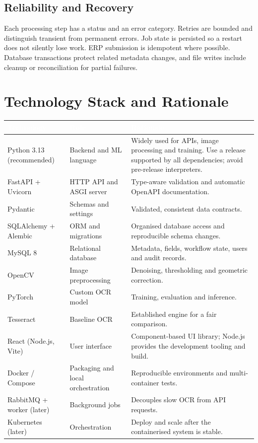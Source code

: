 \documentclass[11pt,a4paper]{report}
\newcommand{\hdr}[1]{\textcolor{white}{\sffamily\bfseries #1}}
\newcommand{\tblstart}{\rowcolors{2}{white}{rowgray}\arrayrulecolor{teal!60}}
\newcommand{\hdrrow}{\rowcolor{navy}}
\begin{document}
\section{Reliability and Recovery}
Each processing step has a status and an error category. Retries are bounded and distinguish transient from permanent errors. Job state is persisted so a restart does not silently lose work. ERP submission is idempotent where possible. Database transactions protect related metadata changes, and file writes include cleanup or reconciliation for partial failures.

\chapter{Technology Stack and Rationale}
{\tblstart\small
\begin{longtable}{L{3.3cm}L{3.5cm}L{6.9cm}}
\hdrrow \hdr{Technology} & \hdr{Role} & \hdr{Rationale}\\ \endhead
Python 3.13 (recommended) & Backend and ML language & Widely used for APIs, image processing and training. Use a release supported by all dependencies; avoid pre-release interpreters.\\
FastAPI + Uvicorn & HTTP API and ASGI server & Type-aware validation and automatic OpenAPI documentation.\\
Pydantic & Schemas and settings & Validated, consistent data contracts.\\
SQLAlchemy + Alembic & ORM and migrations & Organised database access and reproducible schema changes.\\
MySQL 8 & Relational database & Metadata, fields, workflow state, users and audit records.\\
OpenCV & Image preprocessing & Denoising, thresholding and geometric correction.\\
PyTorch & Custom OCR model & Training, evaluation and inference.\\
Tesseract & Baseline OCR & Established engine for a fair comparison.\\
React (Node.js, Vite) & User interface & Component-based UI library; Node.js provides the development tooling and build.\\
Docker / Compose & Packaging and local orchestration & Reproducible environments and multi-container tests.\\
RabbitMQ + worker (later) & Background jobs & Decouples slow OCR from API requests.\\
Kubernetes (later) & Orchestration & Deploy and scale after the containerised system is stable.\\
\hline
\end{longtable}}
\end{document}
